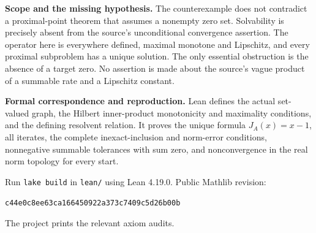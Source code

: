 \documentclass[11pt,a4paper]{article}
\begin{document}
\textbf{Scope and the missing hypothesis.}
The counterexample does not contradict a proximal-point theorem
that assumes a nonempty zero set. Solvability is precisely absent
from the source's unconditional convergence assertion.
The operator here is everywhere defined, maximal monotone and
Lipschitz, and every proximal subproblem has a unique solution.
The only essential obstruction is the absence of a target zero.
No assertion is made about the source's vague product of a
summable rate and a Lipschitz constant.

\textbf{Formal correspondence and reproduction.}
Lean defines the actual set-valued graph, the Hilbert inner-product
monotonicity and maximality conditions, and the defining
resolvent relation. It proves the unique formula $J_A(x)=x-1$,
all iterates, the complete inexact-inclusion and norm-error
conditions, nonnegative summable tolerances with sum zero,
and nonconvergence in the real norm topology for every start.

Run \texttt{lake build} in \texttt{lean/} using Lean 4.19.0.
Public Mathlib revision:
\begin{center}\small
\texttt{c44e0c8ee63ca166450922a373c7409c5d26b00b}
\end{center}
The project prints the relevant axiom audits.
\end{document}
